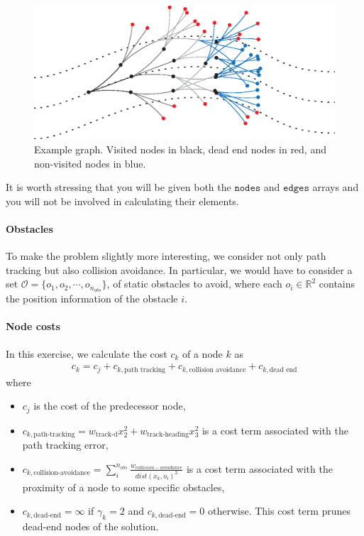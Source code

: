 		\begin{figure}[!h]
			\centering
			\includegraphics[width = \linewidth]{./_imags/Graph}
			\caption{Example graph. Visited nodes in black, dead end nodes in red, and non-visited nodes in blue.}
			\label {fig:Graph}
		\end{figure}
		It is worth stressing that you will be given both the %
		$\texttt{nodes}$ %
		and %
		$\texttt{edges}$ %
		arrays and you will not be involved in calculating their elements. %
	\paragraph{Obstacles}
		To make the problem slightly more interesting, we consider not only path tracking but also collision avoidance.
		In particular, we would have to consider a set %
		$\mathcal{O} = \lbrace o_1, o_2, \cdots, o_{n_{obs}}\rbrace$, %
		of static obstacles to avoid, where each %
		$o_i\in\mathbb{R}^2$ %
		contains the position information of the obstacle %
		$i$.
	\paragraph{Node costs}
		In this exercise, we calculate the cost %
		$c_k$ %
		of a node %
		$k$ %
		as
		\begin{align}
			c_k = c_j + c_{k,\text{path tracking}} + c_{k,\text{collision avoidance}} + c_{k,\text{dead end}}
		\end{align}
		where 
		\begin{itemize}
			\item $c_j$ is the cost of the predecessor node, 
			\item $c_{k,\text{path-tracking}} = w_{\text{track-d}}x_2^2 + w_{\text{track-heading}}x_3^2$ %
			is a cost term associated with the path tracking error,
			\item $c_{k,\text{collision-avoidance}} = \sum_i^{n_{obs}} \frac{w_{collision-avoidance}}{dist(x_k, o_i)^2}$ %
			is a cost term associated with the proximity of a node to some specific obstacles, 
			\item $c_{k,\text{dead-end}} = \infty$ if $\gamma_k = 2$ %
			and %
			$c_{k,\text{dead-end}} = 0$ %
			otherwise. 
			This cost term prunes dead-end nodes of the solution.
		\end{itemize}
